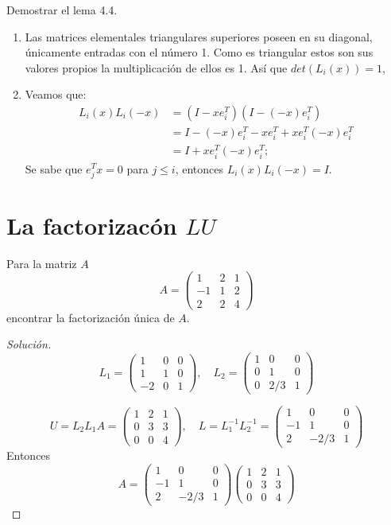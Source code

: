 \documentclass[12pt]{book}
\newenvironment{solucion}
  {\renewcommand\qedsymbol{$\square$}\begin{proof}[Solución]}
  {\end{proof}}
\begin{document}
\eje Demostrar el lema 4.4.
\renewcommand{\labelenumii}{\roman{enumii}.}
\begin{enumerate}
    \item Las matrices elementales triangulares superiores poseen en su diagonal, únicamente entradas con el número 1. Como es triangular estos son sus valores propios la multiplicación de ellos es 1. Así que $det\left(L_i(x)\right)=1$,
    \item Veamos que:
    \begin{align*}
        L_i(x)L_i(-x)&=\left(I-xe_i^T\right)\left(I-(-x)e_i^T\right)\\
        &=I-(-x)e_i^T-xe_i^T+xe_i^T(-x)e_i^T\\
        &=I+xe_i^T(-x)e_i^T;
    \end{align*}
    Se sabe que $e_j^Tx=0$ para $j\leq i$, entonces $L_i(x)L_i(-x)=I$.
\end{enumerate}

\section{La factorizacón $LU$}
\eje Para la matriz $A$
\[A=\begin{pmatrix}
1&2&1\\
-1&1&2\\
2&2&4
\end{pmatrix}\]
encontrar la factorización única de $A$.

\begin{solucion}
\[L_1=\begin{pmatrix}
1 & 0 & 0\\
1 & 1 & 0\\
-2 & 0 & 1
\end{pmatrix},\quad
L_2=\begin{pmatrix}
1 & 0 & 0\\
0 & 1 & 0\\
0 & 2/3 & 1
\end{pmatrix}\]

\[U=L_2L_1A=\begin{pmatrix}
1 & 2 & 1\\
0 & 3 & 3\\
0 & 0 & 4
\end{pmatrix},\quad
L=L_1^{-1}L_2^{-1}=\begin{pmatrix}
1 & 0 & 0\\
-1 & 1 & 0\\
2 & -2/3 & 1
\end{pmatrix}\]
Entonces
\[A=\begin{pmatrix}
1 & 0 & 0\\
-1 & 1 & 0\\
2 & -2/3 & 1
\end{pmatrix}
\begin{pmatrix}
1 & 2 & 1\\
0 & 3 & 3\\
0 & 0 & 4
\end{pmatrix}\]
\end{solucion}
\end{document}
